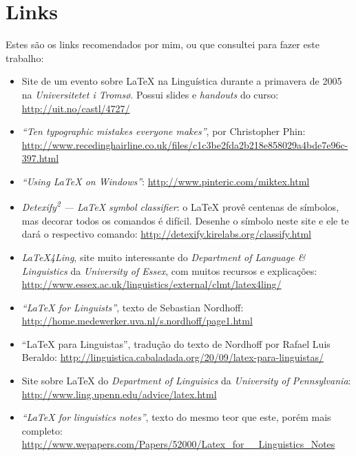 \chapter{Links}

Estes são os links recomendados por mim, ou que consultei para fazer este trabalho:

\begin{itemize}
	\item Site de um evento sobre \LaTeX{} na Linguística durante a primavera de 2005 na \emph{Universitetet i Troms\o}. Possui slides e \emph{handouts} do curso: \href{http://uit.no/castl/4727/}{{\sf http://uit.no/castl/4727/}}
	\item \emph{``Ten typographic mistakes everyone makes''}, por Christopher Phin: \href{http://www.recedinghairline.co.uk/files/c1c3be2fda2b218e858029a4bde7e96c-397.html}{{\sf http://www.recedinghairline.co.uk/fil\-es/c1c3be2fda2b218e858029a4bde7e96c-397.html}}
	\item \emph{``Using \LaTeX{} on Windows''}: \href{http://www.pinteric.com/miktex.html}{{\sf http://www.pinteric.com/miktex.html}}
	\item \emph{Detexify\textsuperscript{2} --- LaTeX symbol classifier}: o \LaTeX{} provê centenas de símbolos, mas decorar todos os comandos é difícil. Desenhe o símbolo neste site e ele te dará o respectivo comando: \href{http://detexify.kirelabs.org/classify.html}{{\sf http://detexify.kire\-labs.org/class\-ify.html}}
	\item \emph{\LaTeX4Ling}, site muito interessante do \emph{Department of Language \& Linguistics} da \emph{University of Essex}, com muitos recursos e explicações: \href{http://www.essex.ac.uk/linguistics/external/clmt/latex4ling/}{{\sf http://www.essex.ac.uk/linguistics/external/clmt/latex4ling/}}
	\item \emph{``\LaTeX{} for Linguists''}, texto de Sebastian Nordhoff: \href{http://home.medewerker.uva.nl/s.nordhoff/page1.html}{{\sf http://home.medewerker.uva.nl/s.nordhoff/page1.html}}
	\item ``\LaTeX{} para Linguistas'', tradução do texto de Nordhoff por Rafael Luis Beraldo: \href{http://linguistica.ca\-ba\-la\-da\-da.org/2009/09/latex-para-linguistas/}{{\sf http://linguistica.ca\-ba\-la\-da\-da.org/20/09/latex-para-linguistas/}}
	\item Site sobre \LaTeX{} do \emph{Department of Linguisics} da \emph{University of Pennsylvania}: \href{http://www.ling.upenn.e\-du/advice/latex.html}{{\sf http://www.ling.upenn.e\-du/ad\-vi\-ce/latex.html}}
	\item \emph{``\LaTeX{} for linguistics notes''}, texto do mesmo teor que este, porém mais completo: \href{http://www.wepapers.com/Papers/52000/Latex\_for\_\_Linguistics\_Notes}{{\sf http://www.we\-papers.com/Pa\-pers/52000/La\-tex\_for\_\_Linguistics\_Notes}}
\end{itemize}
